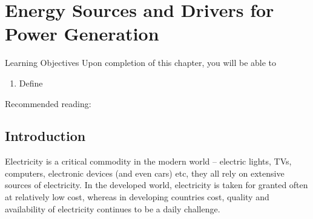
\chapter{Energy Sources and Drivers for Power Generation}\label{Chapter:EnergySourcesDrivers}

   \begin{LearningObjectivesBlock}{Learning Objectives}
      Upon completion of this chapter, you will be able to
        \begin{enumerate}
           \item Define 
        \end{enumerate}
\medskip
     Recommended reading: \citet{DiPippo_Book,Armstead_Book,Barbier_2002,Zarrouk_2014,Rybach_2003,Pollack_1993}
   \end{LearningObjectivesBlock}


\begin{comment}
   \begin{LearningObjectivesBlock}{Learning Objectives}
      Upon completion of this chapter, you will be able to
        \begin{enumerate}
           \item {\bf Knowledge:} Define, Name, Select, State 
           \item {\bf Comprehension:} Describe, Identify, Discuss
           \item {\bf Application:} Apply, Demonstrate, Employ, Sketch
           \item {\bf Analysis:} Analyse, Compare, Calculate, Solve
           \item {\bf Synthesis:} Determine, Formulate
           \item {\bf Evaluation:} Assess, Check, Estimate, Compare, Measure, Monitor
        \end{enumerate}
\end{comment}
  

\localtableofcontents


\section{Introduction}\label{Chapter:EnergySourcesDrivers:Section:Intro}

Electricity is a critical commodity in the modern world -- electric lights, TVs, computers, electronic devices (and even cars) etc, they all rely on extensive sources of electricity. In the developed world, electricity is taken for granted often at relatively low cost, whereas in developing countries cost, quality and availability of electricity continues to be a daily challenge. 

